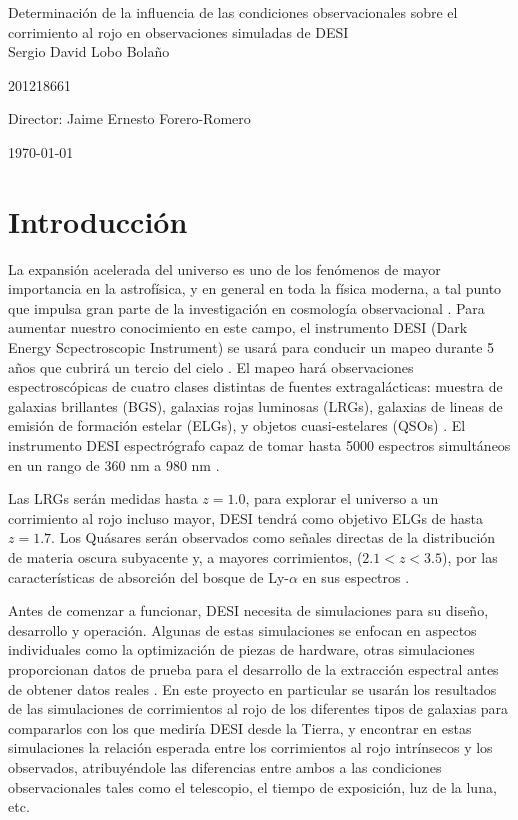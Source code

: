 \documentclass[12pt]{article}
\begin{document}
\begin{center}
\huge

Determinación de la influencia de las condiciones observacionales sobre el corrimiento al rojo en observaciones simuladas de DESI\\
\vspace{3mm}
\Large Sergio David Lobo Bolaño

\large
201218661

\vspace{2mm}
\Large
Director: Jaime Ernesto Forero-Romero


\vspace{2mm}

\today
\end{center}


\section{Introducción}

La expansión acelerada del universo es uno de los fenómenos de mayor
importancia en la astrofísica, y en general en toda la física moderna,
a tal punto que impulsa gran parte de la investigación en cosmología
observacional \cite{Nord:2016plv}. Para aumentar nuestro conocimiento
en este campo, el instrumento DESI (Dark Energy Scpectroscopic
Instrument) se usará para conducir un mapeo durante 5 años que cubrirá
un tercio del cielo \cite{Aghamousa:2016zmz}. El mapeo hará observaciones
espectroscópicas de cuatro clases distintas de fuentes
extragalácticas:   muestra de galaxias brillantes (BGS), galaxias rojas luminosas (LRGs), galaxias de lineas de emisión de formación estelar (ELGs), y objetos cuasi-estelares (QSOs) \cite{Aghamousa:2016zmz}. El instrumento DESI espectrógrafo capaz de tomar hasta 5000 espectros simultáneos en un rango de 360 nm a 980 nm \cite{Aghamousa:2016sne}. 

Las LRGs serán medidas hasta $z = 1.0$, para explorar el universo a un corrimiento al rojo incluso mayor, DESI tendrá como objetivo ELGs de hasta $z = 1.7$. Los Quásares serán observados como señales directas de la distribución de materia oscura subyacente y, a mayores corrimientos, ($2.1<z<3.5$), por las características de absorción del bosque de Ly-$\alpha$ en sus espectros \cite{Aghamousa:2016zmz}. 

Antes de comenzar a funcionar, DESI necesita de simulaciones para su
diseño, desarrollo y operación. Algunas de estas simulaciones se
enfocan en aspectos individuales como la optimización de piezas de
hardware, otras simulaciones proporcionan datos de prueba para el
desarrollo de la extracción espectral antes de obtener datos reales
\cite{Aghamousa:2016sne}. En este proyecto en particular se usarán los
resultados de las simulaciones de corrimientos al rojo de los
diferentes tipos de galaxias para compararlos con los que mediría DESI
desde la Tierra, y encontrar en estas simulaciones la relación
esperada entre los corrimientos al rojo intr\'insecos y los observados,
atribuyéndole las diferencias entre ambos a las condiciones
observacionales tales como el telescopio, el tiempo de exposición, luz
de la luna, etc.   
\end{document}
